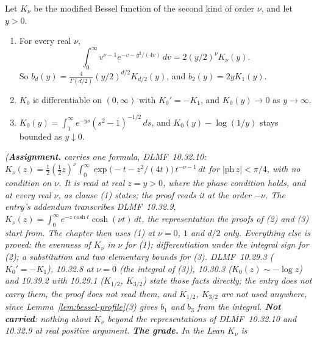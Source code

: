 \begin{lemma}
\label{lem:bessel-k}
\leanok
{}
Let $K_\nu$ be the modified Bessel function of the second kind of order $\nu$, and let $y > 0$.
\begin{enumerate}
\item For every real $\nu$,
\[
  \int_0^\infty v^{\nu-1}e^{-v-y^2/(4v)}\,dv = 2(y/2)^\nu K_\nu(y) .
\]
So $b_d(y) = \frac{4}{\Gamma(d/2)}(y/2)^{d/2}K_{d/2}(y)$, and $b_2(y) = 2yK_1(y)$.
\item $K_0$ is differentiable on $(0, \infty)$ with $K_0' = -K_1$, and $K_0(y) \to 0$ as
$y \to \infty$.
\item $K_0(y) = \int_1^\infty e^{-ys}(s^2 - 1)^{-1/2}\,ds$, and $K_0(y) - \log(1/y)$ stays bounded
as $y \downarrow 0$.
\end{enumerate}
\statusA\quad{}\quad\emph{(\textbf{Assignment.}  carries one formula,
DLMF~10.32.10: $K_\nu(z) = \tfrac12(\tfrac12z)^\nu\int_0^\infty\exp\bigl(-t - z^2/(4t)\bigr)\,
t^{-\nu-1}\,dt$ for $|\mathrm{ph}\,z| < \pi/4$, with no condition on $\nu$. It is read at real
$z = y > 0$, where the phase condition holds, and at every real $\nu$, as clause (1) states; the
proof reads it at the order $-\nu$. The entry's addendum transcribes DLMF~10.32.9,
$K_\nu(z) = \int_0^\infty e^{-z\cosh t}\cosh(\nu t)\,dt$, the representation the proofs of (2) and (3)
start from. The chapter then uses (1) at $\nu = 0$, $1$ and $d/2$ only. Everything else is proved:
the evenness of $K_\nu$ in $\nu$ for (1); differentiation under the integral sign for (2); a
substitution and two elementary bounds for (3). DLMF~10.29.3 ($K_0' = -K_1$), 10.32.8 at
$\nu = 0$ (the integral of (3)), 10.30.3 ($K_0(z) \sim -\log z$) and 10.39.2 with 10.29.1
($K_{1/2}$, $K_{3/2}$) state those facts directly; the entry does not carry them, the proof does
not read them, and
$K_{1/2}$, $K_{3/2}$ are not used anywhere, since Lemma~\ref{lem:bessel-profile}(3) gives $b_1$ and
$b_3$ from the integral. \textbf{Not carried}: nothing about $K_\nu$ beyond the representations of
DLMF~10.32.10 and 10.32.9 at real positive argument. \textbf{The grade.} In the Lean $K_\nu$ is
}
\end{lemma}

